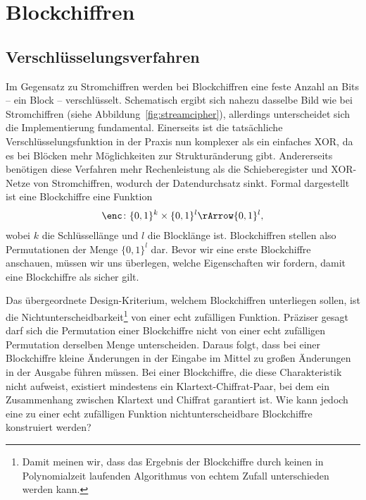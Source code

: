 \section{Blockchiffren}
\label{sec:blockchiffren}
\subsection{Verschlüsselungsverfahren}
Im Gegensatz zu Stromchiffren werden bei Blockchiffren eine feste Anzahl an Bits -- ein Block -- verschlüsselt. Schematisch ergibt sich nahezu dasselbe Bild wie bei Stromchiffren (siehe Abbildung~\ref{fig:streamcipher}), allerdings unterscheidet sich die Implementierung fundamental. Einerseits ist die tatsächliche Verschlüsselungsfunktion in der Praxis nun komplexer als ein einfaches XOR, da es bei Blöcken mehr Möglichkeiten zur Strukturänderung gibt. Andererseits benötigen diese Verfahren mehr Rechenleistung als die Schieberegister und XOR-Netze von Stromchiffren, wodurch der Datendurchsatz sinkt.
Formal dargestellt ist eine Blockchiffre eine Funktion
\begin{align*}
	\enc \colon \{0, 1\}^k \times \{0, 1\}^l \rArrow \{0, 1\}^l\text{,}
\end{align*}
wobei \(k\) die Schlüssellänge und \(l\) die Blocklänge ist. Blockchiffren stellen also Permutationen der Menge 
\(\{0, 1\}^l\) dar.
Bevor wir eine erste Blockchiffre anschauen, müssen wir uns überlegen, welche Eigenschaften wir fordern, damit eine Blockchiffre als sicher gilt.

Das übergeordnete Design-Kriterium, welchem Blockchiffren unterliegen sollen, ist die Nichtunterscheidbarkeit\footnote{Damit meinen wir, dass das Ergebnis der Blockchiffre durch keinen in Polynomialzeit laufenden Algorithmus von echtem Zufall unterschieden werden kann.} von einer echt zufälligen Funktion. Präziser gesagt darf sich die Permutation einer Blockchiffre nicht von einer echt zufälligen Permutation derselben Menge unterscheiden. Daraus folgt, dass bei einer Blockchiffre kleine Änderungen in der Eingabe im Mittel zu großen Änderungen in der Ausgabe führen müssen. Bei einer Blockchiffre, die diese Charakteristik nicht aufweist, existiert mindestens ein Klartext-Chiffrat-Paar, bei dem ein Zusammenhang zwischen Klartext und Chiffrat garantiert ist. Wie kann jedoch eine zu einer echt zufälligen Funktion nichtunterscheidbare Blockchiffre konstruiert werden?

